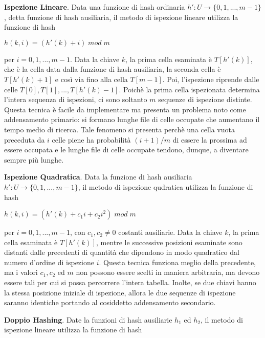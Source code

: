 \vspace{10pt}

\textbf{Ispezione Lineare}. Data una funzione di hash ordinaria \(h':U\to \{0,1,...,m-1\}\), detta funzione di hash ausiliaria, il metodo di ispezione lineare utilizza la funzione di hash

\(h(k,i)=(h'(k)+i)\;mod\;m\)

\noindent per \(i=0,1,...,m-1\). Data la chiave \(k\), la prima cella esaminata è \(T[h'(k)]\), che è la cella data dalla funzione di hash ausiliaria, la seconda cella è \(T[h'(k)+1]\) e così via fino alla cella \(T[m-1]\). Poi, l'ispezione riprende dalle celle \(T[0], T[1],...,T[h'(k)-1]\). Poichè la prima cella ispezionata determina l'intera sequenza di ispezioni, ci sono soltanto \(m\) sequenze di ispezione distinte. Questa tecnica è facile da implementare ma presenta un problema noto come addensamento primario: si formano lunghe file di celle occupate che aumentano il tempo medio di ricerca. Tale fenomeno si presenta perchè una cella vuota preceduta da \(i\) celle piene ha probabilità \((i+1)/m\) di essere la prossima ad essere occupata e le lunghe file di celle occupate tendono, dunque, a diventare sempre più lunghe.

\vspace{10pt}

\textbf{Ispezione Quadratica}. Data la funzione di hash ausiliaria \(h':U\to \{0,1,...,m-1\}\), il metodo di ispezione qudratica utilizza la funzione di hash

\(h(k,i)=(h'(k)+c_1i+c_2i^2)\;mod\;m\)

\noindent per \(i=0,1,...,m-1\), con \(c_1, c_2 \neq 0 \) costanti ausiliarie. Data la chiave \(k\), la prima cella esaminata è \(T[h'(k)]\), mentre le successive posizioni esaminate sono distanti dalle precedenti di quantità che dipendono in modo quadratico dal numero d'ordine di ispezione \(i\). Questa tecnica funziona meglio della precedente, ma i valori \(c_1, c_2\) ed \(m\) non possono essere scelti in maniera arbitraria, ma devono essere tali per cui si possa percorrere l'intera tabella. Inolte, se due chiavi hanno la stessa posizione iniziale di ispezione, allora le due sequenze di ispezione saranno identiche portando al cosiddetto addensamento secondario.

\vspace{10pt}

\textbf{Doppio Hashing}. Date la funzioni di hash ausiliarie \(h_1\) ed \(h_2\), il metodo di ispezione lineare utilizza la funzione di hash


